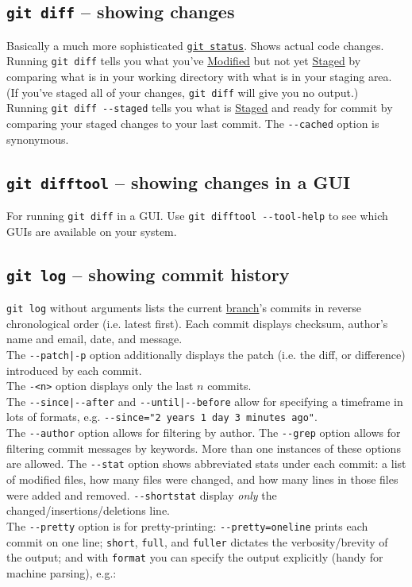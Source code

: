 \documentclass[8pt, table, xcdraw]{article}%
\begin{document}
\subsection{\lstinline{git diff} -- showing changes}

Basically a much more sophisticated \hyperref[status]{\lstinline{git status}}. Shows actual code changes.\\
Running \lstinline{git diff} tells you what you've \hyperref[states]{Modified} but not yet \hyperref[states]{Staged} by comparing what is in your working directory with what is in your staging area. (If you've staged all of your changes, \lstinline{git diff} will give you no output.)\\
Running \lstinline{git diff --staged} tells you what is \hyperref[states]{Staged} and ready for commit by comparing your staged changes to your last commit. The \lstinline{--cached} option is synonymous.

\subsection{\lstinline{git difftool} -- showing changes in a GUI}

For running \lstinline{git diff} in a GUI. Use \lstinline{git difftool --tool-help} to see which GUIs are available on your system.

\subsection{\lstinline{git log} -- showing commit history}

\lstinline{git log} without arguments lists the current \hyperref[branching]{branch}'s commits in reverse chronological order (i.e. latest first). Each commit displays checksum, author’s name and email, date, and message.\\
The \lstinline{--patch|-p} option additionally displays the patch (i.e. the diff, or difference) introduced by each commit.\\
The \lstinline{-<n>} option displays only the last $n$ commits.\\
The \lstinline{--since|--after} and \lstinline{--until|--before} allow for specifying a timeframe in lots of formats, e.g. \lstinline{--since="2 years 1 day 3 minutes ago"}.\\
The \lstinline{--author} option allows for filtering by author. The \lstinline{--grep} option allows for filtering commit messages by keywords. More than one instances of these options are allowed.
The \lstinline{--stat} option shows abbreviated stats under each commit: a list of modified files, how many files were changed, and how many lines in those files were added and removed. \lstinline{--shortstat} display \textit{only} the changed/insertions/deletions line.\\
The \lstinline{--pretty} option is for pretty-printing: \lstinline{--pretty=oneline} prints each commit on one line; \lstinline{short}, \lstinline{full}, and \lstinline{fuller} dictates the verbosity/brevity of the output; and with \lstinline{format} you can specify the output explicitly (handy for machine parsing), e.g.:
\end{document}
